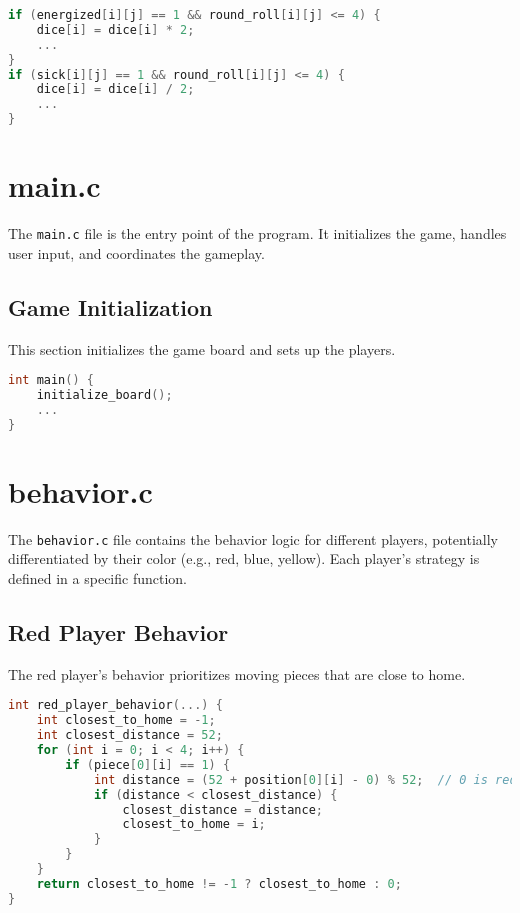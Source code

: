 \documentclass{article}
\begin{document}
\begin{lstlisting}[language=C,caption={Handling Energized and Sick Pieces},label={lst:special_states}]
if (energized[i][j] == 1 && round_roll[i][j] <= 4) {
    dice[i] = dice[i] * 2;
    ...
}
if (sick[i][j] == 1 && round_roll[i][j] <= 4) {
    dice[i] = dice[i] / 2;
    ...
}
\end{lstlisting}

\section{main.c}
The \texttt{main.c} file is the entry point of the program. It initializes the game, handles user input, and coordinates the gameplay.

\subsection{Game Initialization}
This section initializes the game board and sets up the players.

\begin{lstlisting}[language=C,caption={Game Initialization in \texttt{main.c}},label={lst:initialization}]
int main() {
    initialize_board();
    ...
}
\end{lstlisting}

\section{behavior.c}
The \texttt{behavior.c} file contains the behavior logic for different players, potentially differentiated by their color (e.g., red, blue, yellow). Each player's strategy is defined in a specific function.

\subsection{Red Player Behavior}
The red player's behavior prioritizes moving pieces that are close to home.

\begin{lstlisting}[language=C,caption={Red Player Behavior},label={lst:red_behavior}]
int red_player_behavior(...) {
    int closest_to_home = -1;
    int closest_distance = 52;
    for (int i = 0; i < 4; i++) {
        if (piece[0][i] == 1) {
            int distance = (52 + position[0][i] - 0) % 52;  // 0 is red's home position
            if (distance < closest_distance) {
                closest_distance = distance;
                closest_to_home = i;
            }
        }
    }
    return closest_to_home != -1 ? closest_to_home : 0;
}
\end{lstlisting}
\end{document}
